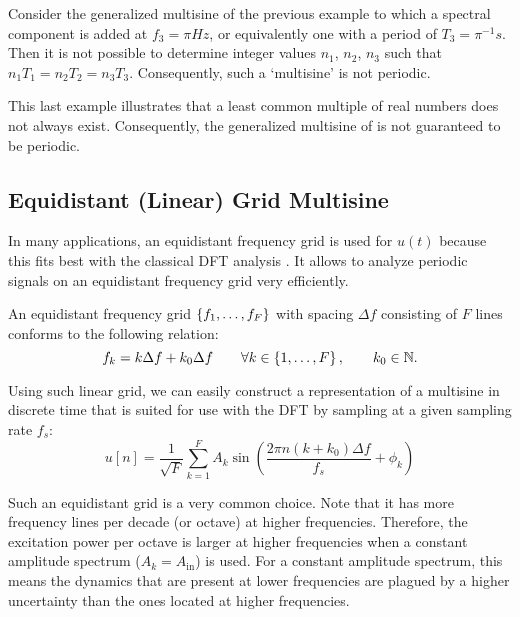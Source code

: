   \begin{example}
   Consider the generalized multisine of the previous example to which a spectral component is added at $f_3 = \pi \unit{Hz}$, or equivalently one with a period of $T_3 = \pi^{-1} \unit{s}$.
   Then it is not possible to determine integer values $n_1$, $n_2$, $n_3$ such that $n_1 T_1 = n_2 T_2 = n_3 T_3$.
   Consequently, such a `multisine' is not periodic.
  \end{example}

  This last example illustrates that a least common multiple of real numbers does not always exist.
  Consequently, the generalized multisine of  is not guaranteed to be periodic.

  
\subsection{Equidistant (Linear) Grid Multisine}
  In many applications, an equidistant frequency grid is used for $u\left( t\right) $ because this fits best with the classical DFT analysis \citep{OppenheimDT,Mandal2007}. It allows to analyze periodic signals on an equidistant frequency grid very efficiently.
  
  An equidistant frequency grid $\left\{f_1, \ldots, f_F\right\}$ with spacing $\Delta f$
  consisting of $F$ lines conforms to the following relation:
  \begin{equation}
    f_k = k \Delta f + k_0 \Delta f
    \qquad \forall k \in \left\{1,\ldots,F\right\},
    \qquad k_0 \in \mathbb{N}
    \text{.}
  \label{eq:linGrid}
  \end{equation}
  
  Using such linear grid, we can easily construct a representation of a multisine
  in discrete time that is suited for use with the DFT by sampling at a given sampling rate $f_s$:
  \begin{equation}
     u \left[ n\right] = \frac{1}{\sqrt{F}}
     \sum_{k=1}^{F} 
       A_k 
       \sin 
         \left(\frac{2\pi n \left( k + k_0 \right) \Delta f}{f_s} + \phi_k \right)
    \label{eq:MultiSineDT}
  \end{equation}
  
  Such an equidistant grid is a very common choice.
  Note that it has more frequency lines per decade (or octave) at higher frequencies.
  Therefore, the excitation power per octave is larger at higher frequencies
  when a constant amplitude spectrum ($A_k = A_{\mathrm{in}}$) is used.
  For a constant amplitude spectrum, this means the dynamics that are present at lower frequencies are plagued by a higher uncertainty than the ones located at higher frequencies.
  
